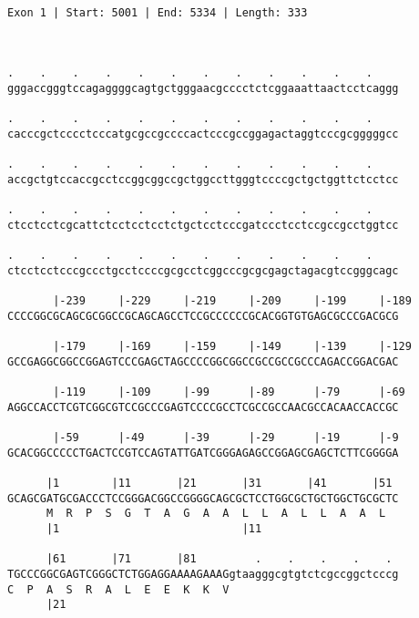 \documentclass{article}
\begin{document}
 \begin{Verbatim}
 
Exon 1 | Start: 5001 | End: 5334 | Length: 333



.    .    .    .    .    .    .    .    .    .    .    .    
gggaccgggtccagaggggcagtgctgggaacgcccctctcggaaattaactcctcaggg
                                                            
.    .    .    .    .    .    .    .    .    .    .    .    
cacccgctcccctcccatgcgccgccccactcccgccggagactaggtcccgcgggggcc
                                                            
.    .    .    .    .    .    .    .    .    .    .    .    
accgctgtccaccgcctccggcggccgctggccttgggtccccgctgctggttctcctcc
                                                            
.    .    .    .    .    .    .    .    .    .    .    .    
ctcctcctcgcattctcctcctcctctgctcctcccgatccctcctccgccgcctggtcc
                                                            
.    .    .    .    .    .    .    .    .    .    .    .    
ctcctcctcccgccctgcctccccgcgcctcggcccgcgcgagctagacgtccgggcagc
                                                            
       |-239     |-229     |-219     |-209     |-199     |-189
CCCCGGCGCAGCGCGGCCGCAGCAGCCTCCGCCCCCCGCACGGTGTGAGCGCCCGACGCG
                                                            
       |-179     |-169     |-159     |-149     |-139     |-129
GCCGAGGCGGCCGGAGTCCCGAGCTAGCCCCGGCGGCCGCCGCCGCCCAGACCGGACGAC
                                                            
       |-119     |-109     |-99      |-89      |-79      |-69
AGGCCACCTCGTCGGCGTCCGCCCGAGTCCCCGCCTCGCCGCCAACGCCACAACCACCGC
                                                            
       |-59      |-49      |-39      |-29      |-19      |-9
GCACGGCCCCCTGACTCCGTCCAGTATTGATCGGGAGAGCCGGAGCGAGCTCTTCGGGGA
                                                            
      |1        |11       |21       |31       |41       |51 
GCAGCGATGCGACCCTCCGGGACGGCCGGGGCAGCGCTCCTGGCGCTGCTGGCTGCGCTC
      M  R  P  S  G  T  A  G  A  A  L  L  A  L  L  A  A  L  
      |1                            |11                     
  
      |61       |71       |81         .    .    .    .    . 
TGCCCGGCGAGTCGGGCTCTGGAGGAAAAGAAAGgtaagggcgtgtctcgccggctcccg
C  P  A  S  R  A  L  E  E  K  K  V                          
      |21                                                   
  

\end{Verbatim}
\end{document}
